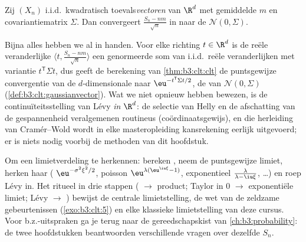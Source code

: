 \begin{theorem}
\label{thm:b3:clt:multiclt}
Zij $(X_n)$ i.i.d.\ kwadratisch 
toevals\emph{vectoren} van $\R^d$ met gemiddelde $m$ en
covariantiematrix $\Sigma$. Dan convergeert $\frac{S_n - nm}{\sqrt
n}$ in  naar de  $\mathcal N(0,
\Sigma)$.
\admitted
\end{theorem}

\begin{remark}\label{rem:b3:clt:multiclt}
Bijna alles hebben we al in handen. Voor elke richting $t \in
\R^d$ is de reële veranderlijke $\langle t, \frac{S_n -
nm}{\sqrt n}\rangle$ een genormeerde som van i.i.d.\ reële
veranderlijken met variantie $t^{\mathsf T}\Sigma t$, dus geeft
de berekening van \cref{thm:b3:clt:clt} de puntsgewijze
convergentie van de $d$-dimensionale 
naar $\eu^{-t^{\mathsf T}\Sigma t/2}$, de 
van $\mathcal N(0, \Sigma)$
(\cref{def:b3:clt:gaussianvector}). Wat we niet opnieuw hebben
bewezen, is de continuïteitsstelling van Lévy \emph{in $\R^d$}:
de selectie van Helly en de afschatting van de gespannenheid
veralgemenen routineus (coördinaatsgewijs), en die herleiding van
Cramér--Wold wordt in elke masteropleiding kansrekening eerlijk
uitgevoerd; er is niets nodig voorbij de methoden van dit
hoofdstuk.
\end{remark}

\begin{method}\label{met:b3:clt:method}
Om een limietverdeling te herkennen: bereken , neem de puntsgewijze limiet, herken haar (
$\eu^{-\sigma^2\xi^2/2}$, poisson $\eu^{\lambda(\eu^{\iu\xi}-1)}$,
exponentieel $\frac{\lambda} {\lambda - \iu\xi}$, \dots) en roep
Lévy in. Het ritueel in drie stappen ( $\to$
product; Taylor in $0$ $\to$ exponentiële limiet; Lévy $\to$
) bewijst de centrale limietstelling, de
wet van de zeldzame gebeurtenissen (\cref{exo:b3:clt:5}) en elke
klassieke limietstelling van deze cursus. Voor b.z.-uitspraken ga
je terug naar de gereedschapskist van \cref{ch:b3:probability}:
de twee hoofdstukken beantwoorden verschillende vragen over
dezelfde $S_n$.
\end{method}

